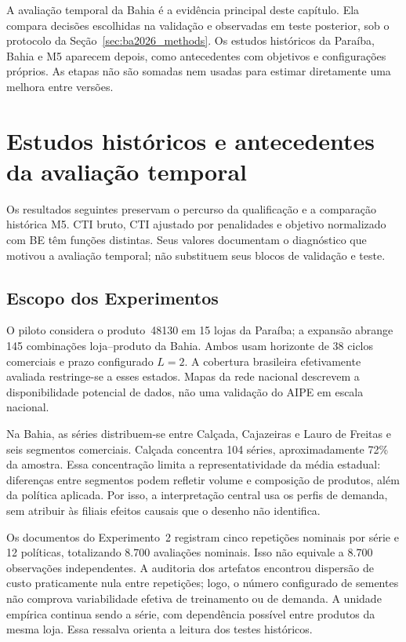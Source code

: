 
A avaliação temporal da Bahia é a evidência principal deste capítulo. Ela compara decisões escolhidas na validação e observadas em teste posterior, sob o protocolo da Seção~\ref{sec:ba2026_methods}. Os estudos históricos da Paraíba, Bahia e M5 aparecem depois, como antecedentes com objetivos e configurações próprios. As etapas não são somadas nem usadas para estimar diretamente uma melhora entre versões.



\section{Estudos históricos e antecedentes da avaliação temporal}
\label{sec:historical_studies}

Os resultados seguintes preservam o percurso da qualificação e a comparação histórica M5. CTI bruto, CTI ajustado por penalidades e objetivo normalizado com BE têm funções distintas. Seus valores documentam o diagnóstico que motivou a avaliação temporal; não substituem seus blocos de validação e teste.

\subsection{Escopo dos Experimentos}

O piloto considera o produto~48130 em 15 lojas da Paraíba; a expansão abrange 145 combinações loja--produto da Bahia. Ambos usam horizonte de 38 ciclos comerciais e prazo configurado $L=2$. A cobertura brasileira efetivamente avaliada restringe-se a esses estados. Mapas da rede nacional descrevem a disponibilidade potencial de dados, não uma validação do AIPE em escala nacional.

Na Bahia, as séries distribuem-se entre Calçada, Cajazeiras e Lauro de Freitas e seis segmentos comerciais. Calçada concentra 104 séries, aproximadamente 72\% da amostra. Essa concentração limita a representatividade da média estadual: diferenças entre segmentos podem refletir volume e composição de produtos, além da política aplicada. Por isso, a interpretação central usa os perfis de demanda, sem atribuir às filiais efeitos causais que o desenho não identifica.

Os documentos do Experimento~2 registram cinco repetições nominais por série e 12 políticas, totalizando 8.700 avaliações nominais. Isso não equivale a 8.700 observações independentes. A auditoria dos artefatos encontrou dispersão de custo praticamente nula entre repetições; logo, o número configurado de sementes não comprova variabilidade efetiva de treinamento ou de demanda. A unidade empírica continua sendo a série, com dependência possível entre produtos da mesma loja. Essa ressalva orienta a leitura dos testes históricos.

